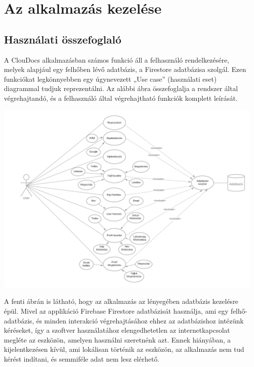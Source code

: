 \documentclass[12pt, twoside]{report}
\begin{document}
\section{Az alkalmazás kezelése}
\subsection{Használati összefoglaló}
A ClouDocs alkalmazásban számos funkció áll a felhasználó rendelkezésére, melyek alapjául egy felhőben lévő adatbázis, a Firestore adatbázisa szolgál. Ezen funkciókat legkönnyebben egy úgynevezett „Use case” (használati eset) diagrammal tudjuk reprezentálni. Az alábbi ábra összefoglalja a rendszer által végrehajtandó, és a felhasználó által végrehajtható funkciók komplett leírását.

\begin{center}
	\includegraphics[width=150mm,scale=0.5,]{usecase.png}
\end{center}

A fenti ábrán is látható, hogy az alkalmazás az lényegében adatbázis kezelésre épül. Mivel az applikáció Firebase Firestore adatbázisát használja, ami egy felhő-adatbázis, és minden interakció végrehajtásához ehhez az adatbázishoz intézünk kéréseket, így a szoftver használatához elengedhetetlen az internetkapcsolat megléte az eszközön, amelyen használni szeretnénk azt. Ennek hiányában, a kijelentkezésen kívül, ami lokálisan történik az eszközön, az alkalmazás nem tud kérést indítani, és semmiféle adat nem lesz elérhető.
\end{document}
